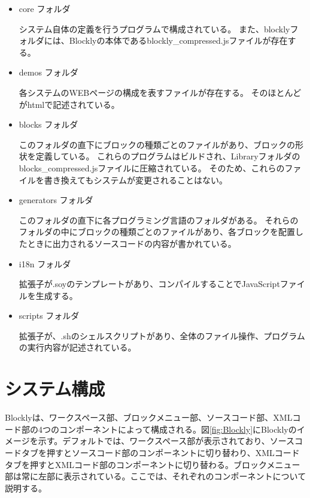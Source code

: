 \documentclass{risepaper}
\begin{document}
\begin{itemize}

\item core フォルダ

システム自体の定義を行うプログラムで構成されている。
また、blocklyフォルダには、Blocklyの本体であるblockly\_compressed.jsファイルが存在する。

\item demos フォルダ

各システムのWEBページの構成を表すファイルが存在する。
そのほとんどがhtmlで記述されている。

\item blocks フォルダ

このフォルダの直下にブロックの種類ごとのファイルがあり、ブロックの形状を定義している。
これらのプログラムはビルドされ、Libraryフォルダのblocks\_compressed.jsファイルに圧縮されている。
そのため、これらのファイルを書き換えてもシステムが変更されることはない。

\item generators フォルダ

このフォルダの直下に各プログラミング言語のフォルダがある。
それらのフォルダの中にブロックの種類ごとのファイルがあり、各ブロックを配置したときに出力されるソースコードの内容が書かれている。

\item i18n フォルダ

拡張子が.soyのテンプレートがあり、コンパイルすることでJavaScriptファイルを生成する。

\item scripts フォルダ

拡張子が、.shのシェルスクリプトがあり、全体のファイル操作、プログラムの実行内容が記述されている。


\end{itemize} 
  
   \section{システム構成}
   
Blocklyは、ワークスペース部、ブロックメニュー部、ソースコード部、XMLコード部の4つのコンポーネントによって構成される。図\ref{fig:Blockly}にBlocklyのイメージを示す。デフォルトでは、ワークスペース部が表示されており、ソースコードタブを押すとソースコード部のコンポーネントに切り替わり、XMLコードタブを押すとXMLコード部のコンポーネントに切り替わる。ブロックメニュー部は常に左部に表示されている。ここでは、それぞれのコンポーネントについて説明する。
  
\end{document}
